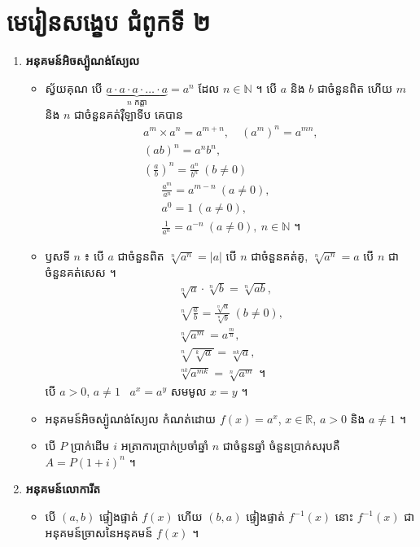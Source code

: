 \section*{មេរៀនសង្ខេប ជំពូកទី ២}
\begin{note}[មេរៀនសង្ខេប]
\begin{enumerate}[1]
  \item \textbf{អនុគមន៍អិចស្ប៉ូណង់ស្យែល}
  \begin{itemize}
    \item ស្វ័យគុណ បើ $\underbrace{a \cdot a \cdot a \cdot \ldots \cdot a}_{n \text{ កត្តា}} = a^n$ ដែល $n \in \mathbb{N}$ ។ បើ $a$ និង $b$ ជាចំនួនពិត ហើយ $m$ និង $n$ ជាចំនួនគត់រ៉ឺឡាទីប គេបាន
    \[
\begin{gathered}
a^m \times a^n = a^{m+n}, \quad (a^m)^n = a^{mn},\\
(ab)^n = a^nb^n,\\
\left(\frac{a}{b}\right)^n = \frac{a^n}{b^n} \ (b \ne 0)
\end{gathered}
\]
    \[
\begin{gathered}
\frac{a^m}{a^n} = a^{m-n} \ (a \ne 0),\\
a^0 = 1 \ (a \ne 0),\\
\frac{1}{a^n} = a^{-n} \ (a \ne 0), \ n \in \mathbb{N} \text{ ។}
\end{gathered}
\]
    \item ឫសទី $n$ ៖ បើ $a$ ជាចំនួនពិត $\sqrt[n]{a^n} = |a|$ បើ $n$ ជាចំនួនគត់គូ, $\sqrt[n]{a^n} = a$ បើ $n$ ជាចំនួនគត់សេស ។
    \[
\begin{gathered}
\sqrt[n]{a} \cdot \sqrt[n]{b} = \sqrt[n]{ab},\\
\sqrt[n]{\frac{a}{b}} = \frac{\sqrt[n]{a}}{\sqrt[n]{b}} \ (b \ne 0),\\
\sqrt[n]{a^m} = a^{\frac{m}{n}},\\
\sqrt[n]{\sqrt[k]{a}} = \sqrt[nk]{a},\\
\sqrt[nk]{a^{mk}} = \sqrt[n]{a^m} \text{ ។}
\end{gathered}
\]
    បើ $a > 0$, $a \ne 1$ \ $a^x = a^y$ សមមូល $x = y$ ។
    \item អនុគមន៍អិចស្ប៉ូណង់ស្យែល កំណត់ដោយ $f(x) = a^x$, $x \in \mathbb{R}$, $a > 0$ និង $a \ne 1$ ។
    \item បើ $P$ ប្រាក់ដើម $i$ អត្រាការប្រាក់ប្រចាំឆ្នាំ $n$ ជាចំនួនឆ្នាំ ចំនួនប្រាក់សរុបគឺ $A = P(1 + i)^n$ ។
  \end{itemize}
  \item \textbf{អនុគមន៍លោការីត}
  \begin{itemize}
    \item បើ $(a, b)$ ផ្ទៀងផ្ទាត់ $f(x)$ ហើយ $(b, a)$ ផ្ទៀងផ្ទាត់ $f^{-1}(x)$ នោះ $f^{-1}(x)$ ជាអនុគមន៍ច្រាសនៃអនុគមន៍ $f(x)$ ។

\end{itemize}
\end{enumerate}
\end{note}
